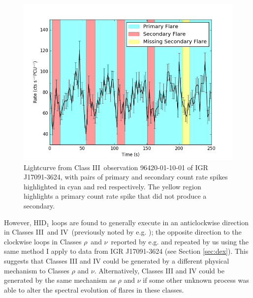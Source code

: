 \begin{figure}
    \includegraphics[width=\columnwidth, trim = 0mm 0mm 0mm 0mm]{images/classIIIsecpeak.png}
    \captionsetup{singlelinecheck=off}
    \caption[Lightcurve from Class III observation 96420-01-10-01 of IGR J17091-3624, with pairs of primary and secondary count rate spikes highlighted.]{Lightcurve from Class III\indexiii\ observation 96420-01-10-01 of IGR J17091-3624, with pairs of primary and secondary count rate spikes highlighted in cyan and red respectively.  The yellow region highlights a primary count rate spike that did not produce a secondary.}
   \label{fig:III_IV_spike}
\end{figure}

\par However, HID$_1$ loops are found to generally execute in an anticlockwise direction in Classes III\indexiii\ and IV\indexiv\ (previously noted by e.g. \citealp{Altamirano_IGR_FH}); the opposite direction to the clockwise loops in Classes $\rho$\indexrho\ and $\nu$\indexnu\ reported by e.g. \citealp{Belloni_GRS_MI} and repeated by us using the same method I apply to data from IGR J17091-3624 (see Section \ref{sec:dex}).  This suggests that Classes III and IV could be generated by a different physical mechanism to Classes $\rho$ and $\nu$.  Alternatively, Classes III and IV could be generated by the same mechanism as $\rho$ and $\nu$ if some other unknown process was able to alter the spectral evolution of flares in these classes.

